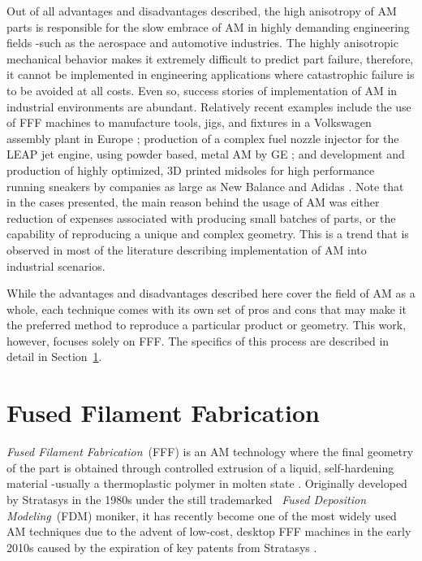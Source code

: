 \documentclass[main.tex]{subfiles}
\begin{document}
Out of all advantages and disadvantages described, the high anisotropy of AM parts is responsible for the slow embrace of AM in highly demanding engineering fields -such as the aerospace and automotive industries. The highly anisotropic mechanical behavior makes it extremely difficult to predict part failure, therefore, it cannot be implemented in engineering applications where catastrophic failure is to be avoided at all costs. Even so, success stories of implementation of AM in industrial environments are abundant. Relatively recent examples include the use of FFF machines to manufacture tools, jigs, and fixtures in a Volkswagen assembly plant in Europe \cite{deVries2017}; production of a complex fuel nozzle injector for the LEAP jet engine, using powder based, metal AM by GE \cite{GEAdditive2016}; and development and production of highly optimized, 3D printed midsoles for high performance running sneakers by companies as large as New Balance and Adidas \cite{NewBalance2016,Matisons2015,Saunders2018}. Note that in the cases presented, the main reason behind the usage of AM was either reduction of expenses associated with producing small batches of parts, or the capability of reproducing a unique and complex geometry. This is a trend that is observed in most of the literature describing implementation of AM into industrial scenarios.

While the advantages and disadvantages described here cover the field of AM as a whole, each technique comes with its own set of pros and cons that may make it the preferred method to reproduce a particular product or geometry. This work, however, focuses solely on FFF. The specifics of this process are described in detail in Section~\ref{sec:FFF}.

\section{Fused Filament Fabrication}\label{sec:FFF} 
\emph{Fused Filament Fabrication}~(FFF) is an AM technology where the final geometry of the part is obtained through controlled extrusion of a liquid, self-hardening material -usually a thermoplastic polymer in molten state \cite{Gibson2015}. Originally developed by Stratasys in the 1980s under the still trademarked ~\emph{Fused Deposition Modeling}~(FDM\texttrademark) moniker, it has recently become one of the most widely used AM techniques due to the advent of low-cost, desktop FFF machines in the early 2010s caused by the expiration of key patents from Stratasys \cite{Gibson2015,Capote2017}. 
\end{document}
